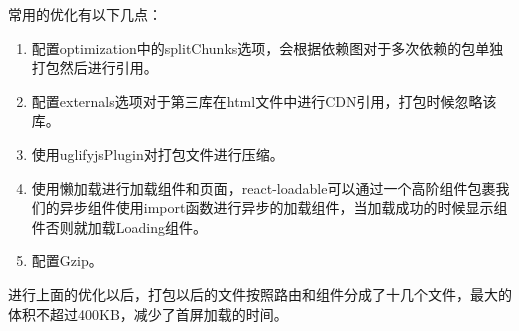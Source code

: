 常用的优化有以下几点：

\begin{enumerate}
	\item 配置optimization中的splitChunks选项，会根据依赖图对于多次依赖的包单独打包然后进行引用。
	\item 配置externals选项对于第三库在html文件中进行CDN引用，打包时候忽略该库。
	\item 使用uglifyjsPlugin对打包文件进行压缩。
	\item 使用懒加载进行加载组件和页面，react-loadable可以通过一个高阶组件包裹我们的异步组件使用import函数进行异步的加载组件，当加载成功的时候显示组件否则就加载Loading组件。
	\item 配置Gzip。
\end{enumerate}

进行上面的优化以后，打包以后的文件按照路由和组件分成了十几个文件，最大的体积不超过400KB，减少了首屏加载的时间。
